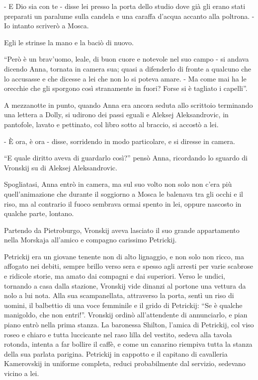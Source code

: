 - E Dio sia con te - disse lei presso la porta dello studio dove già gli erano stati preparati un paralume sulla candela e una caraffa d'acqua accanto alla poltrona. - Io intanto scriverò a Mosca. 

Egli le strinse la mano e la baciò di nuovo. 

``Però è un brav'uomo, leale, di buon cuore e notevole nel suo campo - si andava dicendo Anna, tornata in camera sua; quasi a difenderlo di fronte a qualcuno che lo accusasse e che dicesse a lei che non lo si poteva amare. - Ma come mai ha le orecchie che gli sporgono così stranamente in fuori? Forse si è tagliato i capelli''. 

A mezzanotte in punto, quando Anna era ancora seduta allo scrittoio terminando una lettera a Dolly, si udirono dei passi eguali e Aleksej Aleksandrovic, in pantofole, lavato e pettinato, col libro sotto al braccio, si accostò a lei. 

- È ora, è ora - disse, sorridendo in modo particolare, e si diresse in camera. 

``E quale diritto aveva di guardarlo così?'' pensò Anna, ricordando lo sguardo di Vronskij su di Aleksej Aleksandrovic. 

Spogliatasi, Anna entrò in camera, ma sul suo volto non solo non c'era più quell'animazione che durante il soggiorno a Mosca le balenava tra gli occhi e il riso, ma al contrario il fuoco sembrava ormai spento in lei, oppure nascosto in qualche parte, lontano. 

Partendo da Pietroburgo, Vronskij aveva lasciato il suo grande appartamento nella Morskaja all'amico e compagno carissimo Petrickij. 

Petrickij era un giovane tenente non di alto lignaggio, e non solo non ricco, ma affogato nei debiti, sempre brillo verso sera e spesso agli arresti per varie scabrose e ridicole storie, ma amato dai compagni e dai superiori. Verso le undici, tornando a casa dalla stazione, Vronskij vide dinanzi al portone una vettura da nolo a lui nota. Alla sua scampanellata, attraverso la porta, sentì un riso di uomini, il balbettio di una voce femminile e il grido di Petrickij: ``Se è qualche manigoldo, che non entri!''. Vronskij ordinò all'attendente di annunciarlo, e pian piano entrò nella prima stanza. La baronessa Shilton, l'amica di Petrickij, col viso roseo e chiaro e tutta luccicante nel raso lilla del vestito, sedeva alla tavola rotonda, intenta a far bollire il caffè, e come un canarino riempiva tutta la stanza della sua parlata parigina. Petrickij in cappotto e il capitano di cavalleria Kamerovskij in uniforme completa, reduci probabilmente dal servizio, sedevano vicino a lei. 

